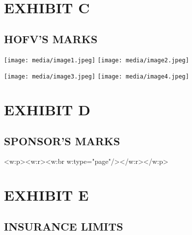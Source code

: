 \documentclass[
]{article}
\begin{document}
\newpage

\hypertarget{exhibit-c}{%
\section{EXHIBIT C}\label{exhibit-c}}

\hypertarget{hofvs-marks}{%
\subsection{HOFV'S MARKS}\label{hofvs-marks}}

\texttt{[image: media/image1.jpeg]}
\texttt{[image: media/image2.jpeg]}

\texttt{[image: media/image3.jpeg]}
\texttt{[image: media/image4.jpeg]}

\newpage

\hypertarget{exhibit-d}{%
\section{EXHIBIT D}\label{exhibit-d}}

\hypertarget{sponsors-marks}{%
\subsection{SPONSOR'S MARKS}\label{sponsors-marks}}

\emph{\textbf{\hfill\break
}}

<w:p><w:r><w:br w:type="page"/></w:r></w:p>

\hypertarget{exhibit-e}{%
\section{EXHIBIT E}\label{exhibit-e}}

\hypertarget{insurance-limits}{%
\subsection{INSURANCE LIMITS}\label{insurance-limits}}
\end{document}
